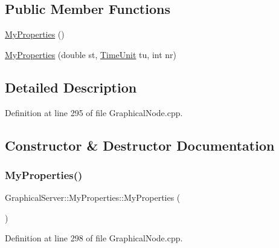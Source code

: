 \subsection*{Public Member Functions}
\begin{DoxyCompactItemize}
\item 
\hyperlink{class_graphical_server_1_1_my_properties_af80c194c728c2d46b763dc51b6a3d043}{My\+Properties} ()
\item 
\hyperlink{class_graphical_server_1_1_my_properties_a2bf05ed3a98a40bc1bec414adf494a69}{My\+Properties} (double st, \hyperlink{_simulation_executive_8h_add9fe45e09605eee3e4a39c8a5c4476d}{Time\+Unit} tu, int nr)
\end{DoxyCompactItemize}


\subsection{Detailed Description}


Definition at line 295 of file Graphical\+Node.\+cpp.



\subsection{Constructor \& Destructor Documentation}
\mbox{\label{class_graphical_server_1_1_my_properties_af80c194c728c2d46b763dc51b6a3d043}} 
\subsubsection{\texorpdfstring{My\+Properties()}{MyProperties()}\hspace{0.1cm}{\footnotesize\ttfamily [1/2]}}
{\footnotesize\ttfamily Graphical\+Server\+::\+My\+Properties\+::\+My\+Properties (\begin{DoxyParamCaption}{ }\end{DoxyParamCaption})\hspace{0.3cm}{\ttfamily [inline]}}



Definition at line 298 of file Graphical\+Node.\+cpp.

\mbox{\label{class_graphical_server_1_1_my_properties_a2bf05ed3a98a40bc1bec414adf494a69}} 
